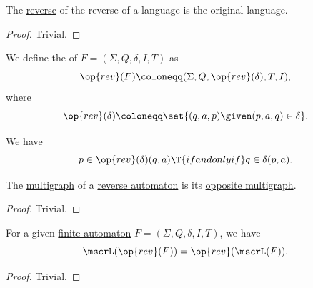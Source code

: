 \begin{proposition}\label{thm:reverse_language_involution}
  The \hyperref[def:reverse_language]{reverse} of the reverse of a language is the original language.
\end{proposition}
\begin{proof}
  Trivial.
\end{proof}

\begin{definition}\label{def:reverse_finite_automaton}\mimprovised
  We define the  of \( F = (\Sigma, Q, \delta, I, T) \) as
  \begin{equation*}
    \op{rev}(F) \coloneqq (\Sigma, Q, \op{rev}(\delta), T, I),
  \end{equation*}
  where
  \begin{equation*}
    \op{rev}(\delta) \coloneqq \set{ (q, a, p) \given (p, a, q) \in \delta }.
  \end{equation*}
\end{definition}
\begin{comments}
  \item We have
  \begin{equation*}
    p \in \op{rev}(\delta)(q, a) \T{if and only if} q \in \delta(p, a).
  \end{equation*}
\end{comments}

\begin{proposition}\label{thm:reverse_finite_automaton_graph}
  The \hyperref[def:finite_automaton/graph]{multigraph} of a \hyperref[def:reverse_finite_automaton]{reverse automaton} is its \hyperref[def:directed_multigraph/opposite]{opposite multigraph}.
\end{proposition}
\begin{proof}
  Trivial.
\end{proof}

\begin{proposition}\label{thm:reverse_finite_automaton_language}
  For a given \hyperref[def:finite_automaton]{finite automaton} \( F = (\Sigma, Q, \delta, I, T) \), we have
  \begin{equation*}
    \mscrL(\op{rev}(F)) = \op{rev}(\mscrL(F)).
  \end{equation*}
\end{proposition}
\begin{proof}
  Trivial.
\end{proof}

